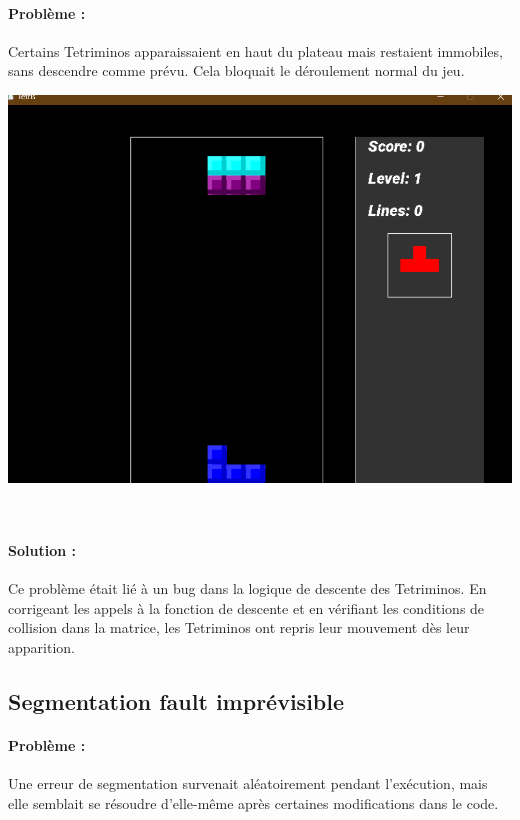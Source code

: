 \documentclass[12pt,a4paper]{report}
\begin{document}
\paragraph{Problème :}
Certains Tetriminos apparaissaient en haut du plateau mais restaient immobiles, sans descendre comme prévu. Cela bloquait le déroulement normal du jeu.
\\
\begin{center}

\includegraphics[scale=0.5]{Figure_Bloque.png} 

\end{center}
\\
\paragraph{Solution :}
Ce problème était lié à un bug dans la logique de descente des Tetriminos. En corrigeant les appels à la fonction de descente et en vérifiant les conditions de collision dans la matrice, les Tetriminos ont repris leur mouvement dès leur apparition.
\\
\subsection{Segmentation fault imprévisible}
\paragraph{Problème :}
Une erreur de segmentation survenait aléatoirement pendant l’exécution, mais elle semblait se résoudre d’elle-même après certaines modifications dans le code.
\end{document}
